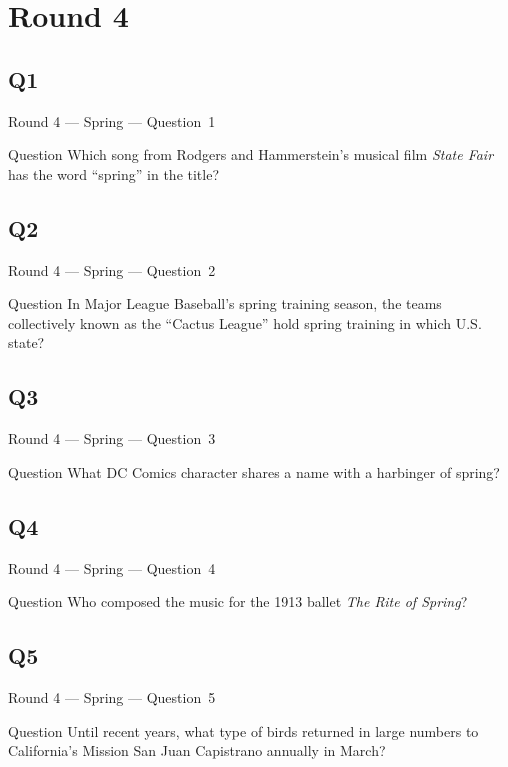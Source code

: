 \documentclass[11pt]{beamer}
\begin{document}
\section{Round 4}
\subsection*{Q1}
\begin{frame}[t]{Round 4 --- Spring --- \mbox{Question 1}}
\vspace{-0.5em}
\begin{block}{Question}
Which song from Rodgers and Hammerstein's musical film \emph{State Fair} has the word ``spring'' in the title? 
\end{block}
\end{frame}
\subsection*{Q2}
\begin{frame}[t]{Round 4 --- Spring --- \mbox{Question 2}}
\vspace{-0.5em}
\begin{block}{Question}
In Major League Baseball's spring training season, the teams collectively known as the ``Cactus League'' hold spring training in which U.S. state?
\end{block}
\end{frame}
\subsection*{Q3}
\begin{frame}[t]{Round 4 --- Spring --- \mbox{Question 3}}
\vspace{-0.5em}
\begin{block}{Question}
What DC Comics character shares a name with a harbinger of spring?
\end{block}
\end{frame}
\subsection*{Q4}
\begin{frame}[t]{Round 4 --- Spring --- \mbox{Question 4}}
\vspace{-0.5em}
\begin{block}{Question}
Who composed the music for the 1913 ballet \emph{The Rite of Spring}?
\end{block}
\end{frame}
\subsection*{Q5}
\begin{frame}[t]{Round 4 --- Spring --- \mbox{Question 5}}
\vspace{-0.5em}
\begin{block}{Question}
Until recent years, what type of birds returned in large numbers to California's Mission San Juan Capistrano annually in March?
\end{block}
\end{frame}
\end{document}
